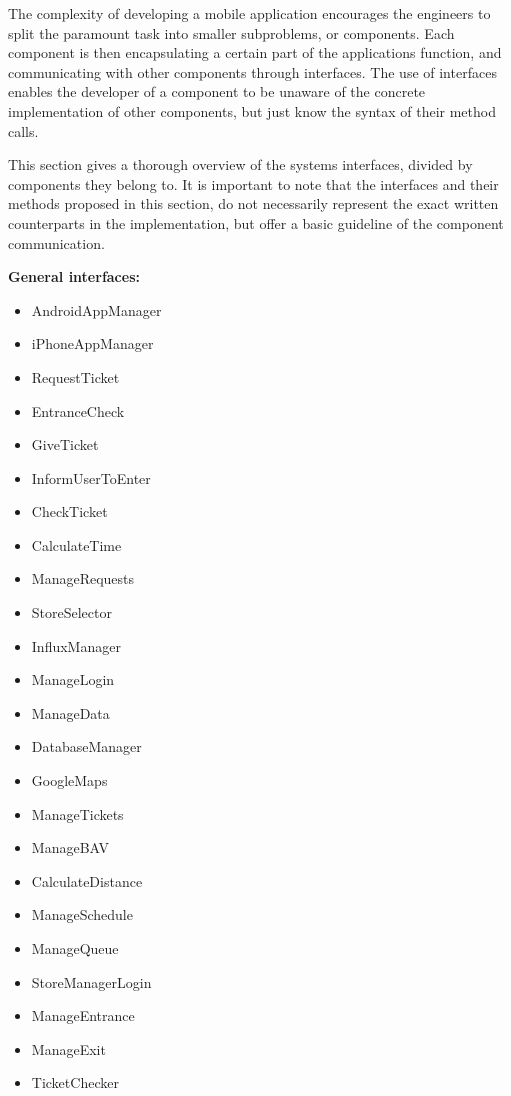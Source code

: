 \hspace{\parindent}The complexity of developing a mobile application encourages the engineers to split the paramount task into smaller subproblems, or components. Each component is then encapsulating a certain part of the applications function, and communicating with other components through interfaces. The use of interfaces enables the developer of a component to be unaware of the concrete implementation of other components, but just know the syntax of their method calls. 

This section gives a thorough overview of the systems interfaces, divided by components they belong to. It is important to note that the interfaces and their methods proposed in this section, do not necessarily represent the exact written counterparts in the implementation, but offer a basic guideline of the component communication. \newline

\textbf{General interfaces: }
\begin{itemize}
\item AndroidAppManager
\item iPhoneAppManager 
\item RequestTicket 
\item EntranceCheck 
\item GiveTicket 
\item InformUserToEnter 
\item CheckTicket 
\item CalculateTime 
\item ManageRequests 
\item StoreSelector 
\item InfluxManager 
\item ManageLogin 
\item ManageData 
\item DatabaseManager 
\item GoogleMaps 
\item ManageTickets 
\item ManageBAV 
\item CalculateDistance 
\item ManageSchedule 
\item ManageQueue 
\item StoreManagerLogin 
\item ManageEntrance 
\item ManageExit 
\item TicketChecker 
\end{itemize}

